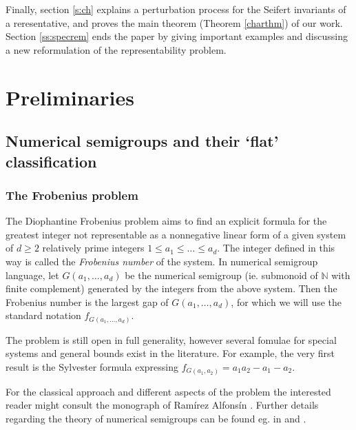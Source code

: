 \documentclass[oneside]{amsart}
\numberwithin{equation}{section}
\numberwithin{equation}{subsection}
\theoremstyle{plain}
\theoremstyle{definition}
\begin{document}
Finally, section \ref{s:ch} explains a perturbation process for the Seifert invariants of a reresentative, and proves the main theorem (Theorem \ref{charthm}) of our work. Section \ref{ss:specrem} ends the paper by giving important examples and discussing a new reformulation of the representability problem.  




% 



\section{Preliminaries}\label{s:prliminaries}

\subsection{Numerical semigroups and their  `flat'  classification}

\subsubsection{\bf The Frobenius problem}

The Diophantine Frobenius problem aims to find an explicit formula for the greatest integer not representable as a nonnegative linear form of a given system of $d\geq 2$ relatively prime integers $1\leq a_1\leq \ldots \leq a_d$. The  integer defined in this way is called the {\it Frobenius number} of the system. In numerical semigroup language, let $G(a_1,\ldots,a_d)$ be the numerical semigroup (ie. submonoid of $\mathbb{N}$ with finite complement) generated by the integers from the above system. Then the Frobenius number is the largest gap of $G(a_1,\ldots,a_d)$, for which we will use the standard notation $f_{G(a_1,\ldots,a_d)}$.
 
The problem is still open in full generality, however several fomulae for special systems and general bounds exist in the literature. For example, the very first result is the  Sylvester formula expressing $f_{G(a_1,a_2)}=a_1a_2-a_1-a_2$.

For the classical approach and different aspects of the problem the interested reader might consult  the monograph of Ram\'irez Alfons\'in \cite{RamAlf}. Further details regarding the theory of numerical semigroups can be found eg. in \cite{book_nsgp} and \cite{book_nsgp2}.
\vspace{0.2cm}
\end{document}
